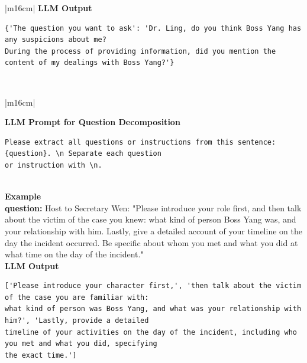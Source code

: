 \documentclass[11pt]{article}
\begin{document}
{\begin{CJK}{UTF8}{gbsn}
\begin{table}[ht!]
\begin{minipage}[t]{\linewidth}
\begin{tabular}{|m{16cm}|}
\hline
{}  \textbf{LLM Output}  \\
\hline
\begin{minipage}[t]{\linewidth}
\small\begin{verbatim}
{'The question you want to ask': 'Dr. Ling, do you think Boss Yang has any suspicions about me? 
During the process of providing information, did you mention the content of my dealings with Boss Yang?'}

\end{verbatim}
\end{minipage} \\
\hline
\end{tabular}
\end{minipage}

\caption{LLM prompts and outputs for selecting other player and asking a question. ( English Translation)}
\end{table}
\end{CJK}

\begin{CJK}{UTF8}{gbsn}
\begin{table}[ht!]
\centering
\begin{minipage}[t]{\linewidth}
\begin{tabular}{|m{16cm}|}
\hline

  {\textbf{LLM Prompt for Question Decomposition}} \\
\begin{minipage}[t]{\linewidth}
\small\begin{verbatim}
Please extract all questions or instructions from this sentence: {question}. \n Separate each question 
or instruction with \n.

\end{verbatim}
\end{minipage} \\
\hline
{}  \textbf{Example}  \\
 \textbf{  question:} \small Host to Secretary Wen: "Please introduce your role first, and then talk about the victim of the case you knew: what kind of person Boss Yang was, and your relationship with him. Lastly, give a detailed account of your timeline on the day the incident occurred. Be specific about whom you met and what you did at what time on the day of the incident." \\

\hline
{}  \textbf{LLM Output}  \\
\hline
\begin{minipage}[t]{\linewidth}
\small\begin{verbatim}
['Please introduce your character first,', 'then talk about the victim of the case you are familiar with: 
what kind of person was Boss Yang, and what was your relationship with him?', 'Lastly, provide a detailed
timeline of your activities on the day of the incident, including who you met and what you did, specifying
the exact time.']


\end{verbatim}
\end{minipage}
\end{tabular}
\end{minipage}
\end{table}
\end{CJK}}
\end{document}
